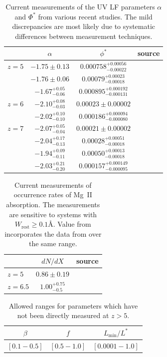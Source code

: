 \documentclass[useAMS,usenatbib]{mn2e}
\newcommand{\magtwo}{Mg~{\small II} }
\begin{document}
\begin{table}
\centering
\begin{tabular}{l c c c}
 &$\alpha$ & $\phi^*$ & source \\
\hline
$z=5$ & $-1.75 \pm 0.13$ & $0.000758^{+0.00056}_{-0.00022}$ & \citet{Mason15} \\
& $-1.76 \pm 0.06$ & $0.00079^{+0.00023}_{-0.00018}$ & \citet{Bouwens15} \\
& $-1.67^{+0.05}_{-0.06}$&$0.000895^{+0.000192}_{-0.000131}$&\citet{Finkelstein15}\\
\hline
$z=6$ & $-2.10^{+0.08}_{-0.03}$&$0.00023\pm0.00002$&\citet{Livermore17} \\
& $-2.02^{+0.10}_{-0.10}$&$0.000186^{+0.000094}_{-0.000080}$&\citet{Finkelstein15}\\
\hline
$z=7$ & $-2.07^{+0.05}_{-0.04}$&$0.00021\pm0.00002$&\citet{Livermore17} \\
&$-2.04^{+0.17}_{-0.13}$&$0.00028^{+0.00051}_{-0.00018}$&\citet{Atek15} \\
&$-1.94^{+0.09}_{-0.11}$&$0.00050^{+0.00013}_{-0.00018}$&\citet{Ishigaki15} \\
& $-2.03^{+0.21}_{-0.20}$&$0.000157^{+0.000149}_{-0.000095}$&\citet{Finkelstein15}\\
\hline
\end{tabular}
\caption{Current measurements of the UV LF parameters $\alpha$ and $\Phi^*$ from various recent studies. The mild discrepancies are most likely due to systematic differences between measurement techniques.}
\end{table}



\begin{table}
\centering
\begin{tabular}{l c c}
 &$dN/dX$ & source \\
\hline
$z=5$ & $0.86\pm0.19$&\citet{Codoreanu17} \\
\hline
$z=6.5$&$1.00_{-0.5}^{+0.75}$&\citet{Bosman17}\\
\hline
\end{tabular}
\caption{Current measurements of occurrence rates of \magtwo absorption. The measurements are sensitive to systems with $W_\text{rest}\geq 0.1$\AA. Value from \citet{Bosman17} incorporates the data from \citet{Chen16} over the same range.}
\end{table}

\begin{table}
\centering
\begin{tabular}{c c c}
$\beta$&$f$&$L_\text{min}/L^*$ \\
\hline
$[0.1 - 0.5]$&$[0.5 - 1.0]$&$[0.0001 - 1.0]$\\
\end{tabular}
\caption{Allowed ranges for parameters which have not been directly measured at $z>5$.}
\end{table}
\end{document}
